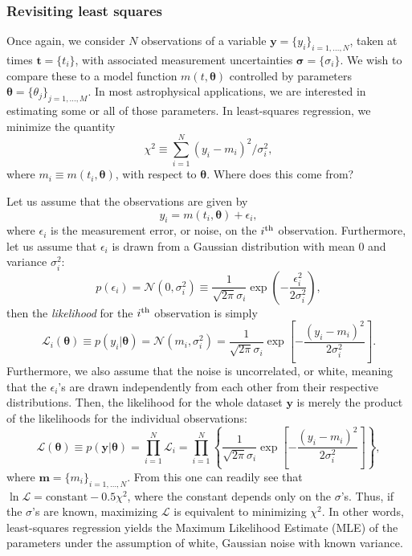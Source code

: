 \documentclass[letterpaper]{ar-1col}
\newcommand{\meanparams}{\ensuremath{\boldsymbol{\theta}}}
\begin{document}
\subsubsection{Revisiting least squares}\label{sec:lsq}

Once again, we consider $N$ observations of a variable $\mathbf{y} = \{ y_i\}_{i=1, \ldots, N}$, taken at times $\mathbf{t} = \{ t_i\}$, with associated measurement uncertainties $\boldsymbol{\sigma}=\{\sigma_i\}$. We wish to compare these to a model function $m(t,\meanparams)$ controlled by parameters $\meanparams=\{\theta_j\}_{j=1,\ldots,M}$. In most astrophysical applications, we are interested in estimating some or all of those parameters. In least-squares regression, we minimize the quantity
\begin{equation}
  \chi^2 \equiv\sum_{i=1}^N (y_i-m_i)^2/\sigma^2_i,
\end{equation}
where $m_i \equiv m(t_i,\meanparams)$, with respect to $\meanparams$. Where does this come from?

Let us assume that the observations are given by
\begin{equation}
  y_i=m(t_i,\meanparams)+\epsilon_i,
\end{equation}
where $\epsilon_i$ is the measurement error, or noise, on the $i^{\rm th}$ observation. Furthermore, let us assume that $\epsilon_i$ is drawn from a Gaussian distribution with mean $0$ and variance $\sigma_i^2$:
\begin{equation}
  p(\epsilon_i)=\mathcal{N}(0,\sigma_i^2) \equiv \frac{1}{\sqrt{2\pi} \sigma_i} \exp\left(-\frac{\epsilon_i^2}{2\sigma_i^2} \right),
\end{equation}
then the \emph{likelihood} for the $i^{\rm th}$ observation is simply
\begin{equation}
  \mathcal{L}_i (\meanparams) \equiv p(y_i|\meanparams)=\mathcal{N}(m_i,\sigma_i^2) =\frac{1}{\sqrt{2\pi} \sigma_i} \exp\left[-\frac{(y_i-m_i)^2}{2\sigma_i^2} \right].
\end{equation}
Furthermore, we also assume that the noise is uncorrelated, or white, meaning that the $\epsilon_i$'s are drawn independently from each other from their respective distributions. Then, the likelihood for the whole dataset $\mathbf{y}$ is merely the product of the likelihoods for the individual observations:
\begin{equation}
  \mathcal{L} (\meanparams) \equiv p(\mathbf{y}|\meanparams) = \prod_{i=1}^N \mathcal{L}_i = \prod_{i=1}^N \left\{ \frac{1}{\sqrt{2\pi} \sigma_i}
  \exp\left[-\frac{(y_i-m_i)^2}{2\sigma_i^2} \right] \right\},
\end{equation}
where $\mathbf{m}=\{m_i\}_{i=1,\ldots,N}$. From this one can readily see that $\ln \mathcal{L} = \mathrm{constant} - 0.5 \chi^2$, where the constant depends only on the $\sigma$'s. Thus, if the $\sigma$'s are known, maximizing $\mathcal{L}$ is equivalent to minimizing $\chi^2$. In other words, least-squares regression yields the Maximum Likelihood Estimate (MLE) of the parameters under the assumption of white, Gaussian noise with known variance.
\end{document}
